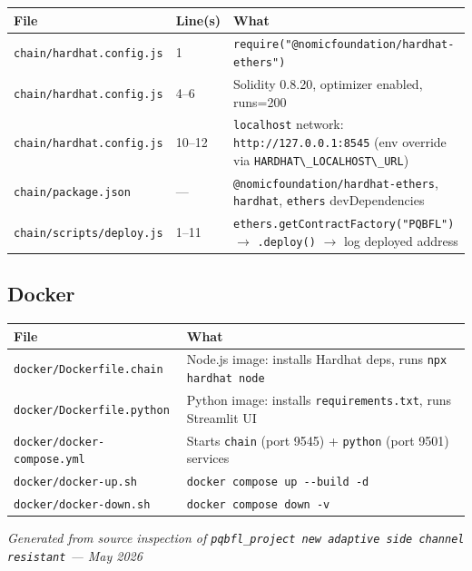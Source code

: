 \documentclass[11pt,a4paper]{article}
\newcommand{\code}[1]{\lstinline[basicstyle=\ttfamily\small]!#1!}
\begin{document}
\begin{longtable}{L{4.5cm} L{1.8cm} L{8cm}}
\toprule
\textbf{File} & \textbf{Line(s)} & \textbf{What} \\
\midrule
\endhead
\bottomrule
\endfoot
\code{chain/hardhat.config.js} & 1      & \code{require("@nomicfoundation/hardhat-ethers")} \\
\code{chain/hardhat.config.js} & 4--6   & Solidity 0.8.20, optimizer enabled, runs=200 \\
\code{chain/hardhat.config.js} & 10--12 & \code{localhost} network: \code{http://127.0.0.1:8545} (env override via \code{HARDHAT\_LOCALHOST\_URL}) \\
\code{chain/package.json}      & ---    & \code{@nomicfoundation/hardhat-ethers}, \code{hardhat}, \code{ethers} devDependencies \\
\code{chain/scripts/deploy.js} & 1--11  & \code{ethers.getContractFactory("PQBFL")} $\to$ \code{.deploy()} $\to$ log deployed address \\
\end{longtable}

\subsection{Docker}

\begin{longtable}{L{5.5cm} L{9cm}}
\toprule
\textbf{File} & \textbf{What} \\
\midrule
\endhead
\bottomrule
\endfoot
\code{docker/Dockerfile.chain}     & Node.js image: installs Hardhat deps, runs \code{npx hardhat node} \\
\code{docker/Dockerfile.python}    & Python image: installs \code{requirements.txt}, runs Streamlit UI \\
\code{docker/docker-compose.yml}   & Starts \code{chain} (port 9545) + \code{python} (port 9501) services \\
\code{docker/docker-up.sh}         & \code{docker compose up --build -d} \\
\code{docker/docker-down.sh}       & \code{docker compose down -v} \\
\end{longtable}

\vfill
\begin{center}
\small\itshape Generated from source inspection of \texttt{pqbfl\_project new adaptive side channel resistant} --- May 2026
\end{center}
\end{document}
